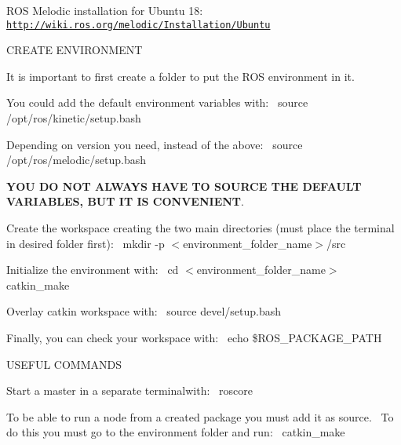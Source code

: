 R\+OS Melodic installation for Ubuntu 18\+:~\newline
\href{http://wiki.ros.org/melodic/Installation/Ubuntu}{\tt http\+://wiki.\+ros.\+org/melodic/\+Installation/\+Ubuntu} \begin{DoxyVerb}                          CREATE ENVIRONMENT
\end{DoxyVerb}


It is important to first create a folder to put the R\+OS environment in it.

You could add the default environment variables with\+:~\newline
{\ttfamily source /opt/ros/kinetic/setup.bash}

Depending on version you need, instead of the above\+:~\newline
{\ttfamily source /opt/ros/melodic/setup.bash}

{\bfseries Y\+OU DO N\+OT A\+L\+W\+A\+YS H\+A\+VE TO S\+O\+U\+R\+CE T\+HE D\+E\+F\+A\+U\+LT V\+A\+R\+I\+A\+B\+L\+ES, B\+UT IT IS C\+O\+N\+V\+E\+N\+I\+E\+NT}.

Create the workspace creating the two main directories (must place the terminal in desired folder first)\+:~\newline
{\ttfamily mkdir -\/p $<$environment\+\_\+folder\+\_\+name$>$/src}

Initialize the environment with\+:~\newline
{\ttfamily cd $<$environment\+\_\+folder\+\_\+name$>$~\newline
catkin\+\_\+make}

Overlay catkin workspace with\+:~\newline
{\ttfamily source devel/setup.\+bash}

Finally, you can check your workspace with\+:~\newline
{\ttfamily echo \$\+R\+O\+S\+\_\+\+P\+A\+C\+K\+A\+G\+E\+\_\+\+P\+A\+TH} \begin{DoxyVerb}                            USEFUL COMMANDS
\end{DoxyVerb}


Start a master in a separate terminalwith\+:~\newline
{\ttfamily roscore}

To be able to run a node from a created package you must add it as source.~\newline
To do this you must go to the environment folder and run\+:~\newline
{\ttfamily catkin\+\_\+make}

